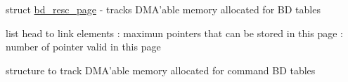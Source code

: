 struct \hyperlink{structbd__resc__page}{bd\_\-resc\_\-page} -\/ tracks DMA'able memory allocated for BD tables

list head to link elements : maximun pointers that can be stored in this page : number of pointer valid in this page

structure to track DMA'able memory allocated for command BD tables 